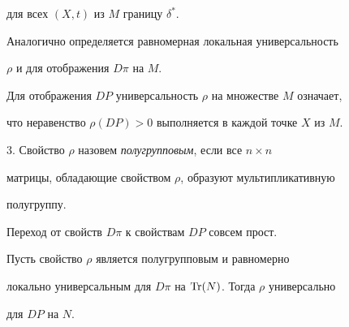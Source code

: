 для всех $(X,t)$ из $M$ границу $\delta^*$. 


 


Аналогично определяется равномерная локальная универсальность 


$\rho$ и для отображения $D\pi$ на $M$. 


 


Для отображения $D P$ универсальность $\rho$ на множестве $M$ означает, 


что неравенство $\rho(D P){>}0$ выполняется в каждой точке $X$ из $M$. 


 


3. Свойство $\rho$ назовем {\it полугрупповым}, если все $n\times n$ 


матрицы, обладающие свойством $\rho$, образуют мультипликативную 


полугруппу. 


 


Переход от свойств $D\pi$ к свойствам $D P$ совсем прост. 


 


\begin{thm} 


Пусть свойство $\rho$ является полугрупповым и равномерно 


локально универсальным для $D\pi$ на $\operatorname{Tr}(N)$. Тогда $\rho$ универсально 


для $D P$ на $N$. 


\end{thm} 


 



